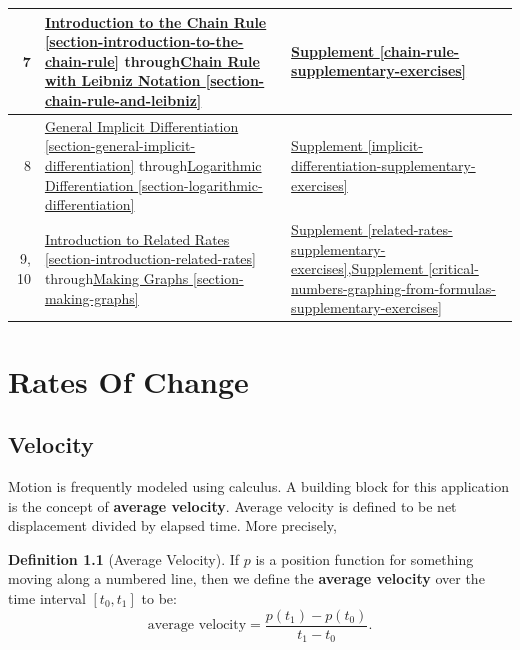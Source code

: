 \documentclass[12pt,]{book}
\newcommand{\terminology}[1]{\textbf{#1}}
\theoremstyle{plain}
\theoremstyle{definition}
\newtheorem{definition}[theorem]{Definition}
\numberwithin{equation}{section}
\newcommand{\fe}[2]{#1\mathopen{}\left(#2\right)\mathclose{}}
\newcommand{\cinterval}[2]{\left[#1,#2\right]}
\begin{document}
\begin{tabular}{rp{3in}p{1.1in}}
\midrule
7&\hyperref[section-introduction-to-the-chain-rule]{Introduction to the Chain Rule \ref{section-introduction-to-the-chain-rule}} through\newline{}\hyperref[section-chain-rule-and-leibniz]{Chain Rule with Leibniz Notation \ref{section-chain-rule-and-leibniz}}&\hyperref[chain-rule-supplementary-exercises]{Supplement \ref{chain-rule-supplementary-exercises}}\\
\midrule
8&\hyperref[section-general-implicit-differentiation]{General Implicit Differentiation \ref{section-general-implicit-differentiation}} through\newline{}\hyperref[section-logarithmic-differentiation]{Logarithmic Differentiation \ref{section-logarithmic-differentiation}}&\hyperref[implicit-differentiation-supplementary-exercises]{Supplement \ref{implicit-differentiation-supplementary-exercises}}\\
\midrule
9, 10&\hyperref[section-introduction-related-rates]{Introduction to Related Rates \ref{section-introduction-related-rates}} through\newline{}\hyperref[section-making-graphs]{Making Graphs \ref{section-making-graphs}}&\hyperref[related-rates-supplementary-exercises]{Supplement \ref{related-rates-supplementary-exercises}},\newline{}\hyperref[critical-numbers-graphing-from-formulas-supplementary-exercises]{Supplement \ref{critical-numbers-graphing-from-formulas-supplementary-exercises}}\\
\bottomrule
\end{tabular}
\setcounter{tocdepth}{1}
\renewcommand*\contentsname{Contents}
\tableofcontents
\mainmatter
\typeout{************************************************}
\typeout{************************************************}
\chapter[Rates Of Change]{Rates Of Change}\label{chapter-rates-of-change}
\typeout{************************************************}
\typeout{************************************************}
\section[Velocity]{Velocity}\label{section-velocity}
Motion is frequently modeled using calculus. A building block for this application is the concept of \terminology{average velocity}. Average velocity is defined to be net displacement divided by elapsed time.  More precisely,%
\begin{definition}[Average Velocity]\label{definition-average-velocity}
If \(p\) is a position function for something moving along a numbered line, then we define the \terminology{average velocity} over the time interval \(\cinterval{t_0}{t_1}\) to be: \[\text{average velocity}=\frac{\fe{p}{t_1}-\fe{p}{t_0}}{t_1-t_0}\text{.}\]%
\end{definition}
\typeout{************************************************}
\typeout{************************************************}
\end{document}
